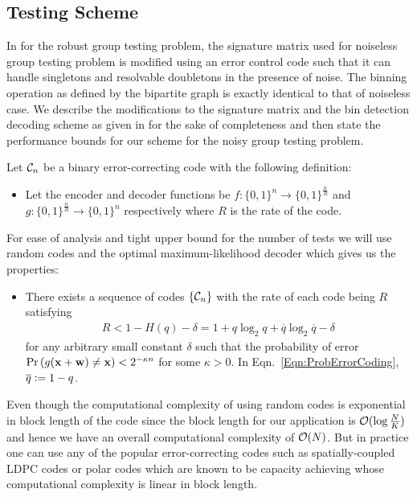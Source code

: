 \subsection*{Testing Scheme}
In \cite{lee2015saffron} for the robust group testing problem, the signature matrix used for noiseless group testing problem is modified using an error control code such that it can handle singletons and resolvable doubletons in the presence of noise. The binning operation as defined by the bipartite graph is exactly identical to that of noiseless case. We describe the modifications to the signature matrix and the bin detection decoding scheme as given in \cite{lee2015saffron} for the sake of completeness and then state the performance bounds for our scheme for the noisy group testing problem.

Let $\mathcal{C}_n$ be a binary error-correcting code with the following definition:
\begin{itemize}
\item Let the encoder and decoder functions be $f:\{0,1\}^{n}\rightarrow \{0,1\}^{\frac{n}{R}}$ and $g:\{0,1\}^{\frac{n}{R}}\rightarrow \{0,1\}^{n}$ respectively where $R$ is the rate of the code.
\end{itemize}
 For ease of analysis and tight upper bound for the number of tests we will use random codes and the optimal maximum-likelihood decoder which gives us the properties:
\begin{itemize}
\item There exists a sequence of codes $\{\mathcal{C}_n\}$ with the rate of each code being $R$ satisfying 
\begin{align}
\label{Eqn:ProbErrorCoding}
R<1-H(q)-\delta=1+q\log_2 q+ \overline{q}\log_2\overline{q}-\delta
\end{align}
for any arbitrary small constant $\delta$ such that the probability of error $\text{Pr}\left(g(\mathbf{x+w})\neq \mathbf{x}\right)<2^{-\kappa n}$ for some $\kappa >0$. In Eqn.~\ref{Eqn:ProbErrorCoding}, $\overline{q}\mathrel{\mathop:}= 1-q$. 
\end{itemize} 
Even though the computational complexity of using random codes is exponential in block length of the code since the block length for our application is $\mathcal{O}(\log \frac{N}{K})$ and hence we have an overall computational complexity of $\mathcal{O}(N)$. But in practice one can use any of the popular error-correcting codes such as spatially-coupled LDPC codes or polar codes which are known to be capacity achieving \cite{kumar2014threshold,kudekar2013spatially} whose computational complexity is linear in block length. 

